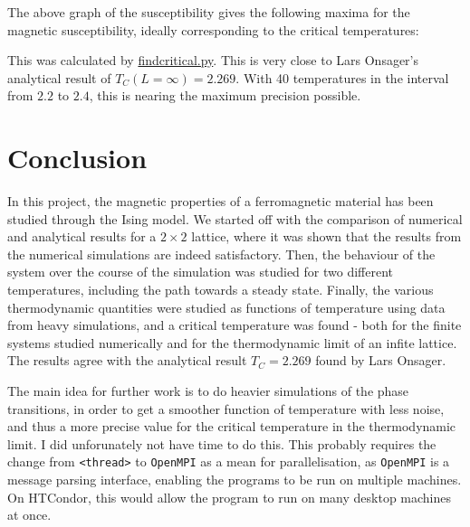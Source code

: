 \documentclass[12pt,english,a4paper]{article}
\newcommand{\program}[1]{\href{https://github.com/anjohan/Offentlig/blob/master/FYS3150/Oblig4/#1}{#1}}
\begin{document}
The above graph of the susceptibility gives the following maxima for the magnetic susceptibility, ideally corresponding to the critical temperatures:

This was calculated by \program{findcritical.py}. This is very close to Lars Onsager's analytical result of \(T_C(L=\infty)=\num{2.269}\). With 40 temperatures in the interval from \(\num{2.2}\) to \(\num{2.4}\), this is nearing the maximum precision possible.


\section{Conclusion}
In this project, the magnetic properties of a ferromagnetic material has been studied through the Ising model. We started off with the comparison of numerical and analytical results for a \(2\times2\) lattice, where it was shown that the results from the numerical simulations are indeed satisfactory. Then, the behaviour of the system over the course of the simulation was studied for two different temperatures, including the path towards a steady state. Finally, the various thermodynamic quantities were studied as functions of temperature using data from heavy simulations, and a critical temperature was found - both for the finite systems studied numerically and for the thermodynamic limit of an infite lattice. The results agree with the analytical result \(T_C=\num{2.269}\) found by Lars Onsager.

The main idea for further work is to do heavier simulations of the phase transitions, in order to get a smoother function of temperature with less noise, and thus a more precise value for the critical temperature in the thermodynamic limit. I did unforunately not have time to do this. This probably requires the change from \texttt{<thread>} to \texttt{OpenMPI} as a mean for parallelisation, as \texttt{OpenMPI} is a message parsing interface, enabling the programs to be run on multiple machines. On HTCondor, this would allow the program to run on many desktop machines at once.


\clearpage
{}
\printbibliography
\end{document}
